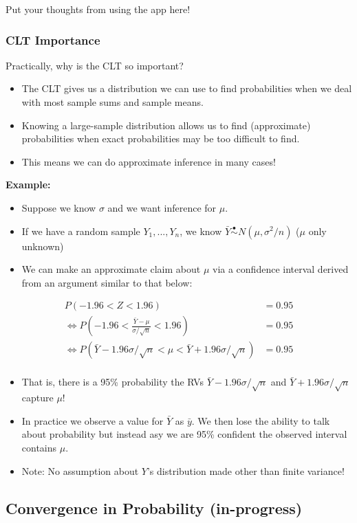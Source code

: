 \documentclass[
]{article}
\providecommand{\tightlist}{%
  \setlength{\itemsep}{0pt}\setlength{\parskip}{0pt}}
\begin{document}
Put your thoughts from using the app here!

\hypertarget{clt-importance}{%
\subsubsection{CLT Importance}\label{clt-importance}}

Practically, why is the CLT so important?

\begin{itemize}
\tightlist
\item
  The CLT gives us a distribution we can use to find probabilities when
  we deal with most sample sums and sample means.
\item
  Knowing a large-sample distribution allows us to find (approximate)
  probabilities when exact probabilities may be too difficult to find.
\item
  This means we can do approximate inference in many cases!
\end{itemize}

\textbf{Example:}

\begin{itemize}
\tightlist
\item
  Suppose we know \(\sigma\) and we want inference for \(\mu\).
\item
  If we have a random sample \(Y_1,...,Y_n\), we know
  \(\bar{Y}\stackrel{\bullet}{\sim}N(\mu,\sigma^2/n)\) (\(\mu\) only
  unknown)
\item
  We can make an approximate claim about \(\mu\) via a confidence
  interval derived from an argument similar to that below:
\end{itemize}

\begin{align*}
P(-1.96<Z<1.96) &= 0.95\\
\Leftrightarrow P\left(-1.96<\frac{\bar{Y}-\mu}{\sigma/\sqrt{n}}<1.96\right) &= 0.95\\
\Leftrightarrow P\left(\bar{Y}-1.96\sigma/\sqrt{n}<\mu<\bar{Y}+1.96\sigma/\sqrt{n}\right) &= 0.95\\
\end{align*}

\begin{itemize}
\tightlist
\item
  That is, there is a 95\% probability the RVs
  \(\bar{Y}-1.96\sigma/\sqrt{n}\) and \(\bar{Y}+1.96\sigma/\sqrt{n}\)
  capture \(\mu\)!
\item
  In practice we observe a value for \(\bar{Y}\) as \(\bar{y}\). We then
  lose the ability to talk about probability but instead asy we are 95\%
  confident the observed interval contains \(\mu\).
\item
  Note: No assumption about \(Y\)'s distribution made other than finite
  variance!
\end{itemize}

\hypertarget{convergence-in-probability-in-progress}{%
\subsection{Convergence in Probability
(in-progress)}\label{convergence-in-probability-in-progress}}
\end{document}
